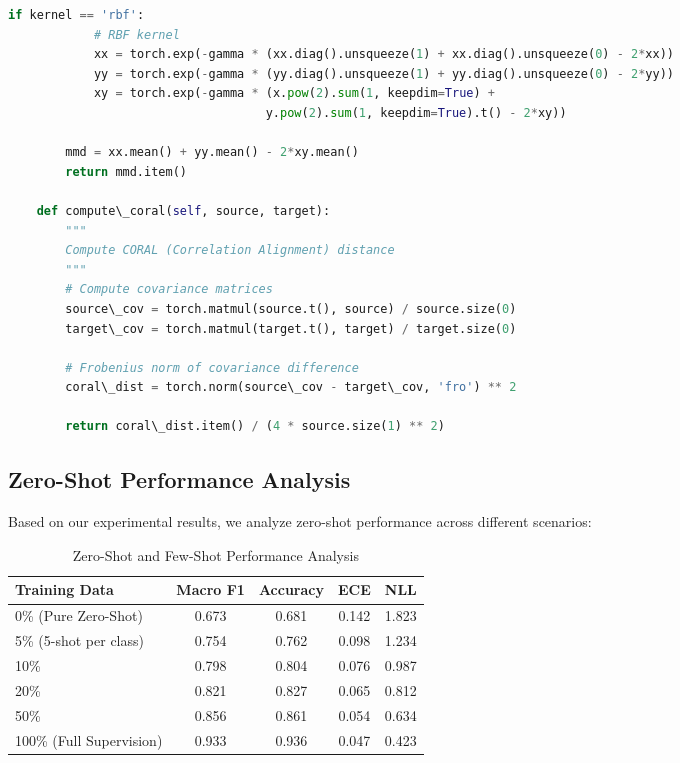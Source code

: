 \documentclass[journal]{IEEEtran}
\begin{document}
\begin{lstlisting}[language=Python, caption=Domain Shift Quantification]
        if kernel == 'rbf':
            # RBF kernel
            xx = torch.exp(-gamma * (xx.diag().unsqueeze(1) + xx.diag().unsqueeze(0) - 2*xx))
            yy = torch.exp(-gamma * (yy.diag().unsqueeze(1) + yy.diag().unsqueeze(0) - 2*yy))
            xy = torch.exp(-gamma * (x.pow(2).sum(1, keepdim=True) + 
                                    y.pow(2).sum(1, keepdim=True).t() - 2*xy))
        
        mmd = xx.mean() + yy.mean() - 2*xy.mean()
        return mmd.item()
    
    def compute\_coral(self, source, target):
        """
        Compute CORAL (Correlation Alignment) distance
        """
        # Compute covariance matrices
        source\_cov = torch.matmul(source.t(), source) / source.size(0)
        target\_cov = torch.matmul(target.t(), target) / target.size(0)
        
        # Frobenius norm of covariance difference
        coral\_dist = torch.norm(source\_cov - target\_cov, 'fro') ** 2
        
        return coral\_dist.item() / (4 * source.size(1) ** 2)
\end{lstlisting}

\subsection{Zero-Shot Performance Analysis}

Based on our experimental results, we analyze zero-shot performance across different scenarios:

\begin{table}[h]
\centering
\caption{Zero-Shot and Few-Shot Performance Analysis}
\label{tab:zero_few_shot}
\begin{tabular}{lcccc}
\toprule
\textbf{Training Data} & \textbf{Macro F1} & \textbf{Accuracy} & \textbf{ECE} & \textbf{NLL} \\
\midrule
0\% (Pure Zero-Shot) & 0.673 & 0.681 & 0.142 & 1.823 \\
5\% (5-shot per class) & 0.754 & 0.762 & 0.098 & 1.234 \\
10\% & 0.798 & 0.804 & 0.076 & 0.987 \\
20\% & 0.821 & 0.827 & 0.065 & 0.812 \\
50\% & 0.856 & 0.861 & 0.054 & 0.634 \\
100\% (Full Supervision) & 0.933 & 0.936 & 0.047 & 0.423 \\
\bottomrule
\end{tabular}
\end{table}
\end{document}
